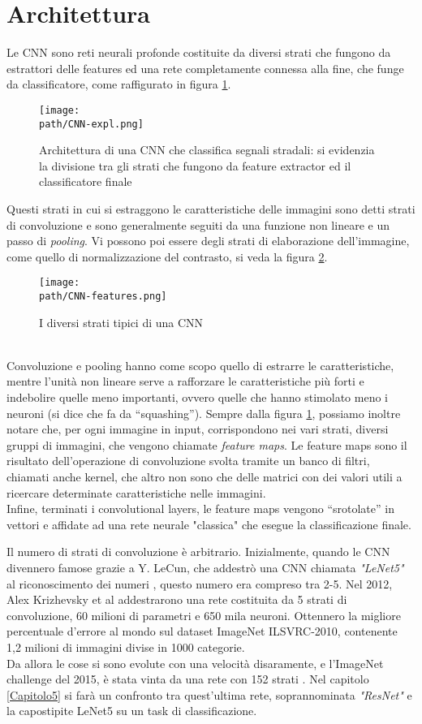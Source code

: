 \section{Architettura}
Le CNN sono reti neurali profonde costituite da diversi strati che fungono da estrattori delle features ed una rete completamente connessa alla fine, che funge da classificatore, come raffigurato in figura \ref{fig:cnn1}. \\
\begin{figure}[h!]
 \centering
 \texttt{[image: \\path/CNN-expl.png]} 
 \caption{Architettura di una CNN che classifica segnali stradali: si evidenzia la divisione tra gli strati che fungono da feature extractor ed il classificatore finale}
 \label{fig:cnn1}
\end{figure}
Questi strati in cui si estraggono le caratteristiche delle immagini sono detti strati di convoluzione e sono generalmente seguiti da una funzione non lineare e un passo di \emph{pooling}. Vi possono poi essere degli strati di elaborazione dell'immagine, come quello di normalizzazione del contrasto, si veda la figura \ref{fig:cnn2}.
\begin{figure}[h!]
 \centering
 \texttt{[image: \\path/CNN-features.png]} 
 \caption{I diversi strati tipici di una CNN}
 \label{fig:cnn2}
\end{figure}
\\
Convoluzione e pooling hanno come scopo quello di estrarre le caratteristiche, mentre l’unità non lineare serve a rafforzare le caratteristiche più forti e indebolire quelle meno importanti, ovvero quelle che hanno stimolato meno i neuroni (si dice che fa da “squashing”). Sempre dalla figura \ref{fig:cnn1}, possiamo inoltre notare che, per ogni immagine in input, corrispondono nei vari strati, diversi gruppi di immagini, che vengono chiamate \emph{feature maps}. Le feature maps sono il risultato dell'operazione di convoluzione svolta tramite un banco di filtri, chiamati anche kernel, che altro non sono che delle matrici con dei valori utili a ricercare determinate caratteristiche nelle immagini.\\
Infine, terminati i convolutional layers, le feature maps vengono “srotolate” in vettori e affidate ad una rete neurale "classica" che esegue la classificazione finale. 

Il numero di strati di convoluzione è arbitrario. Inizialmente, quando le CNN divennero famose grazie a Y. LeCun, che addestrò una CNN chiamata \emph{"LeNet5"} al riconoscimento dei numeri \parencite{lenet}, questo numero era compreso tra 2-5. Nel 2012, Alex Krizhevsky et al \parencite{imagenet2012} addestrarono una rete costituita da 5 strati di convoluzione, 60 milioni di parametri e 650 mila neuroni. Ottennero la migliore percentuale d'errore al mondo sul dataset ImageNet ILSVRC-2010, contenente 1,2 milioni di immagini divise in 1000 categorie. \\
Da allora le cose si sono evolute con una velocità disaramente, e l'ImageNet challenge del 2015, è stata vinta da una rete con 152 strati \parencite{resnet}. Nel capitolo \ref{Capitolo5} si farà un confronto tra quest'ultima rete, soprannominata \emph{"ResNet"} e la capostipite LeNet5 su un task di classificazione.   
